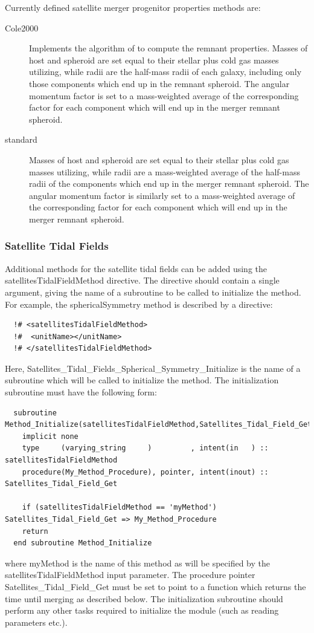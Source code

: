 Currently defined satellite merger progenitor properties methods are:
\begin{description}
 \item [{\normalfont \ttfamily Cole2000}] Implements the algorithm of \cite{cole_hierarchical_2000} to compute the remnant properties. Masses of host and spheroid are set equal to their stellar plus cold gas masses utilizing, while radii are the half-mass radii of each galaxy, including only those components which end up in the remnant spheroid. The angular momentum factor is set to a mass-weighted average of the corresponding factor for each component which will end up in the merger remnant spheroid.
 \item [{\normalfont \ttfamily standard}] Masses of host and spheroid are set equal to their stellar plus cold gas masses utilizing, while radii are a mass-weighted average of the half-mass radii of the components which end up in the merger remnant spheroid. The angular momentum factor is similarly set to a mass-weighted average of the corresponding factor for each component which will end up in the merger remnant spheroid.
\end{description}

\subsubsection{Satellite Tidal Fields}

Additional methods for the satellite tidal fields can be added using the {\normalfont \ttfamily satellitesTidalFieldMethod} directive. The directive should contain a single argument, giving the name of a subroutine to be called to initialize the method. For example, the {\normalfont \ttfamily sphericalSymmetry} method is described by a directive:
\begin{verbatim}
  !# <satellitesTidalFieldMethod>
  !#  <unitName></unitName>
  !# </satellitesTidalFieldMethod>
\end{verbatim}
Here, {\normalfont \ttfamily Satellites\_Tidal\_Fields\_Spherical\_Symmetry\_Initialize} is the name of a subroutine which will be called to initialize the method. The initialization subroutine must have the following form:
\begin{verbatim}
  subroutine Method_Initialize(satellitesTidalFieldMethod,Satellites_Tidal_Field_Get)
    implicit none
    type     (varying_string     )         , intent(in   ) :: satellitesTidalFieldMethod
    procedure(My_Method_Procedure), pointer, intent(inout) :: Satellites_Tidal_Field_Get
    
    if (satellitesTidalFieldMethod == 'myMethod') Satellites_Tidal_Field_Get => My_Method_Procedure
    return
  end subroutine Method_Initialize
\end{verbatim}
where {\normalfont \ttfamily myMethod} is the name of this method as will be specified by the {\normalfont \ttfamily satellitesTidalFieldMethod} input parameter. The procedure pointer {\normalfont \ttfamily Satellites\_Tidal\_Field\_Get} must be set to point to a function which returns the time until merging as described below. The initialization subroutine should perform any other tasks required to initialize the module (such as reading parameters etc.).

